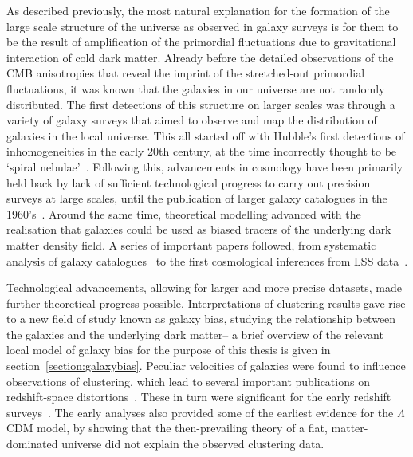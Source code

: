 As described previously, the most natural explanation for the formation of the large scale structure of the universe as observed in galaxy surveys is for them to be the result of amplification of the primordial fluctuations due to gravitational interaction of cold dark matter. Already before the detailed observations of the CMB anisotropies that reveal the imprint of the stretched-out primordial fluctuations, it was known that the galaxies in our universe are not randomly distributed. The first detections of this structure on larger scales was through a variety of galaxy surveys that aimed to observe and map the distribution of galaxies in the local universe. This all started off with Hubble's first detections of inhomogeneities in the early 20th century, at the time incorrectly thought to be `spiral nebulae'~\cite{Hubble:1926,Hubble:1934}. Following this, advancements in cosmology have been primarily held back by lack of sufficient technological progress to carry out precision surveys at large scales, until the publication of larger galaxy catalogues in the 1960's~\cite{Shane:1967,Zwicky:1961}. Around the same time, theoretical modelling advanced with the realisation that galaxies could be used as biased tracers of the underlying dark matter density field. A series of important papers followed, from systematic analysis of galaxy catalogues~\cite{Peebles:1973} to the first cosmological inferences from LSS data~\cite{Zeldovich:1970,Davis:1977mar,Davis:1977aug,Davis:1983,Peebles:1980,Maddox:1990,Baumgart:1991,Park:1992}. 

Technological advancements, allowing for larger and more precise datasets, made further theoretical progress possible. Interpretations of clustering results gave rise to a new field of study known as galaxy bias, studying the relationship between the galaxies and the underlying dark matter\cite{Davis:1985,Rees:1985,Cole:1989vx,Kaiser:1984}-- a brief overview of the relevant local model of galaxy bias for the purpose of this thesis is given in section~\ref{section:galaxybias}. Peculiar velocities of galaxies were found to influence observations of clustering, which lead to several important publications on redshift-space distortions~\cite{Kaiser:1987qv,Davis:1983,Hamilton:1992zz}. These in turn were significant for the early redshift surveys~\cite{Cole:1994wf,Loveday:1995gk,Tadros:1999ky}. The early analyses also provided some of the earliest evidence for the $\Lambda$CDM model, by showing that the then-prevailing theory of a flat, matter-dominated universe did not explain the observed clustering data.

